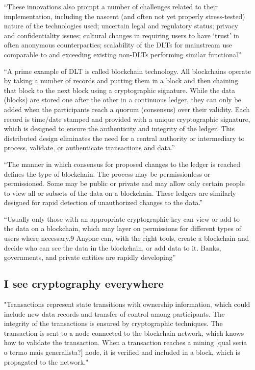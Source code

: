 ``These innovations also prompt a number of challenges related to their implementation, including the nascent (and often not yet properly stress-tested) nature of the technologies used; uncertain legal and regulatory status; privacy and confidentiality issues; cultural changes in requiring users to have ‘trust’ in often anonymous counterparties; scalability of the DLTs for mainstream use comparable to and exceeding existing non-DLTs performing similar functional''~\cite{itu2017}

``A prime example of DLT is called blockchain technology. All blockchains operate by taking a number of records and putting them in a block and then chaining that block to the next block using a cryptographic signature. While the data (blocks) are stored one after the other in a continuous ledger, they can only be added when the participants reach a quorum (consensus) over their validity. Each record is time/date stamped and provided with a unique cryptographic signature, which is designed to ensure the authenticity and integrity of the ledger. This distributed design eliminates the need for a central authority or intermediary to process, validate, or authenticate transactions and data.''~\cite{itu2017}

``The manner in which consensus for proposed changes to the ledger is reached defines the type of blockchain. The process may be permissionless or permissioned. Some may be public or private and may allow only certain people to view all or subsets of the data on a blockchain. These ledgers are similarly designed for rapid detection of unauthorized changes to the data.''~\cite{itu2017}

``Usually only those with an appropriate cryptographic key can view or add to the data on a blockchain, which may layer on permissions for different types of users where necessary.9 Anyone can, with the right tools, create a blockchain and decide who can see the data in the blockchain, or add data to it. Banks, governments, and private entities are rapidly developing''~\cite{itu2017}


\subsection{I see cryptography everywhere}

"Transactions represent state transitions with ownership information, which could include new data records and transfer of control among participants.
The integrity of the transactions is ensured by cryptographic techniques.
The transaction is sent to a node connected to the blockchain network, which knows how to validate the transaction.
When a transaction reaches a mining [qual seria o termo mais generalista?] node, it is verified and included in a block, which is propagated to the network."~\cite{xu2016}

